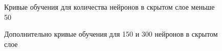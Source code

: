 \documentclass[utf8,usehyperref,14pt]{G7-32}
\begin{document}
\begin{figure}[H]
  \caption{Кривые обучения для количества нейронов в скрытом слое меньше 50}\label{ALOPEX_sum_1}
\end{figure}
\begin{figure}[H]
  \caption{Дополнительно кривые обучения для 150 и 300 нейронов в скрытом слое}\label{ALOPEX_sum_2}
\end{figure}
\end{document}
